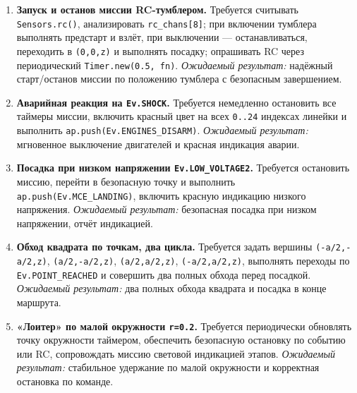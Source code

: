\begin{enumerate}
  \item \textbf{Запуск и останов миссии RC-тумблером.}
    Требуется считывать \texttt{Sensors.rc()}, анализировать \texttt{rc\_chans[8]}; при включении тумблера выполнять предстарт и взлёт, при выключении — останавливаться, переходить в \texttt{(0,0,z)} и выполнять посадку; опрашивать RC через периодический \texttt{Timer.new(0.5, fn)}.
    \textit{Ожидаемый результат:} надёжный старт/останов миссии по положению тумблера с безопасным завершением.
  \item \textbf{Аварийная реакция на \texttt{Ev.SHOCK}.}
    Требуется немедленно остановить все таймеры миссии, включить красный цвет на всех \texttt{0..24} индексах линейки и выполнить \texttt{ap.push(Ev.ENGINES\_DISARM)}.
    \textit{Ожидаемый результат:} мгновенное выключение двигателей и красная индикация аварии.
  \item \textbf{Посадка при низком напряжении \texttt{Ev.LOW\_VOLTAGE2}.}
    Требуется остановить миссию, перейти в безопасную точку и выполнить \texttt{ap.push(Ev.MCE\_LANDING)}, включить красную индикацию низкого напряжения.
    \textit{Ожидаемый результат:} безопасная посадка при низком напряжении, отчёт индикацией.
  \item \textbf{Обход квадрата по точкам, два цикла.}
    Требуется задать вершины \texttt{(-a/2,-a/2,z)}, \texttt{(a/2,-a/2,z)}, \texttt{(a/2,a/2,z)}, \texttt{(-a/2,a/2,z)}, выполнять переходы по \texttt{Ev.POINT\_REACHED} и совершить два полных обхода перед посадкой.
    \textit{Ожидаемый результат:} два полных обхода квадрата и посадка в конце маршрута.
  \item \textbf{«Лоитер» по малой окружности \texttt{r=0.2}.}
    Требуется периодически обновлять точку окружности таймером, обеспечить безопасную остановку по событию или RC, сопровождать миссию световой индикацией этапов.
    \textit{Ожидаемый результат:} стабильное удержание по малой окружности и корректная остановка по команде.
\end{enumerate}

